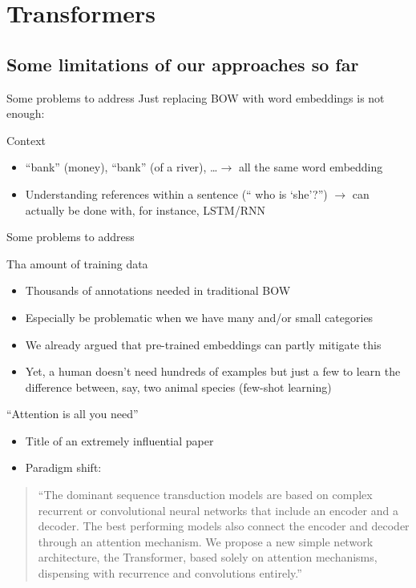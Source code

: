 \section{Transformers}

\subsection{Some limitations of our approaches so far}

\begin{frame}{Some problems to address}
  Just replacing BOW with word embeddings is not enough:
  \begin{block}{Context}
      \begin{itemize}
      \item ``bank'' (money), ``bank'' (of a river), \ldots $\rightarrow$ all the same word embedding
      \item Understanding references within a sentence (`` who is `she'?'') $\rightarrow$ can actually be done with, for instance, LSTM/RNN
      \end{itemize}
  \end{block}
\end{frame}

\begin{frame}{Some problems to address}
  
  \begin{block}{Tha amount of training data}
      \begin{itemize}
      \item Thousands of annotations needed in traditional BOW
      \item Especially be problematic when we have many and/or small categories
      \item We already argued that pre-trained embeddings can partly mitigate this
      \item Yet, a human doesn't need hundreds of examples but just a few to learn the difference between, say, two animal species (few-shot learning)
      \end{itemize}
  \end{block}
\end{frame}


\begin{frame}{``Attention  is all you need''}
  \begin{itemize}
  \item Title of an extremely influential paper \parencite{Vaswani2017}
  \item Paradigm shift:
  \end{itemize}

 \pause
 \begin{quote}
``The dominant sequence transduction models are based on complex recurrent or
convolutional neural networks that include an encoder and a decoder. The best
performing models also connect the encoder and decoder through an attention
mechanism. We propose a new simple network architecture, the Transformer,
based solely on attention mechanisms, dispensing with recurrence and convolutions
entirely.''
\end{quote}
\end{frame}

